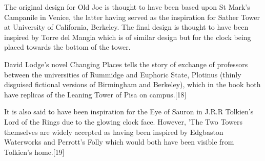 The original design for Old Joe is thought to have been based upon St Mark's Campanile in Venice, the latter having served as the inspiration for Sather Tower at University of California, Berkeley. The final design is thought to have been inspired by Torre del Mangia which is of similar design but for the clock being placed towards the bottom of the tower.

David Lodge's novel Changing Places tells the story of exchange of professors between the universities of Rummidge and Euphoric State, Plotinus (thinly disguised fictional versions of Birmingham and Berkeley), which in the book both have replicas of the Leaning Tower of Pisa on campus.[18]

It is also said to have been inspiration for the Eye of Sauron in J.R.R Tolkien's Lord of the Rings due to the glowing clock face. However, 'The Two Towers themselves are widely accepted as having been inspired by Edgbaston Waterworks and Perrott's Folly which would both have been visible from Tolkien's home.[19] 
